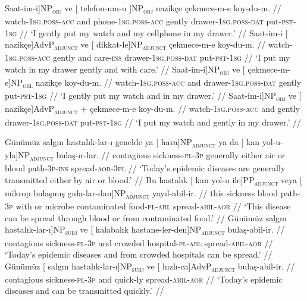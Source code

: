 \pex[exno=TS8, glspace=!1em,everygla={},everyglb={},aboveglbskip=-.15ex, interpartskip=15pt]
\label{TS8}
\a
\begingl
\gla {[} {Saat-im-i}]NP\textsubscript{\textsc{obj}} ve {[} { telefon-um-u }]NP\textsubscript{\textsc{obj}} nazikçe çekmece-m-e koy-du-m. //
\glb {}watch-\textsc{1sg.poss}-\textsc{acc}{} and {phone}-\textsc{1sg.poss}-\textsc{acc}{} gently drawer-\textsc{1sg.poss}-\textsc{dat} put-\textsc{pst}-\textsc{1sg} //
\glft `I gently put my watch and my cellphone in my drawer.' //
\endgl
\a
\begingl\gla Saat-im-i {[} nazikçe{]}AdvP\textsubscript{\textsc{adjunct}} ve {[} dikkat-le{]}NP\textsubscript{\textsc{adjunct}}  çekmece-m-e koy-du-m. //
\glb watch-\textsc{1sg.poss}-\textsc{acc} gently and care-\textsc{ins} drawer-\textsc{1sg.poss}-\textsc{dat} put-\textsc{pst}-\textsc{1sg} //
\glft `I put my watch in my drawer gently and with care.' //
\endgl
\a
\begingl
\gla {[} Saat-im-i{]}NP\textsubscript{\textsc{obj}} ve {[} çekmece-m-e{]}NP\textsubscript{\textsc{obl}} nazikçe koy-du-m. //
\glb {}watch-\textsc{1sg.poss}-\textsc{acc}{} and {}drawer-\textsc{1sg.poss}-\textsc{dat}{} gently put-\textsc{pst}-\textsc{1sg} //
\glft `I gently put my watch and in my drawer.' //
\endgl
\a
\begingl
\gla {[} Saat-im-i{]}NP\textsubscript{\textsc{obj}} ve {[} nazikçe{]}AdvP\textsubscript{\textsc{adjunct}} + çekmece-m-e koy-du-m. //
\glb {}watch-\textsc{1sg.poss}-\textsc{acc}{} and {}gently{} drawer-\textsc{1sg.poss}-\textsc{dat}  put-\textsc{pst}-\textsc{1sg} //
\glft `I put my watch and gently in my drawer.' //
\endgl
\xe

\pex[exno=TS9, glspace=!1em,everygla={},everyglb={},aboveglbskip=-.15ex, interpartskip=15pt]
\label{TS9}
\a
\begingl
\gla Günümüz salgın hastalık-lar-ı genelde ya {[} {hava]}NP\textsubscript{\textsc{adjunct}} {ya da} {[} kan {yol-u-yla]}NP\textsubscript{\textsc{adjunct}} bulaş-ır-lar. //
 contagious sickness-\textsc{pl}-\textsc{3p} generally either air or blood path-\textsc{3p}-\textsc{ins} spread-\textsc{aor}-\textsc{3pl} //
\glft `Today's epidemic diseases are generally transmitted either by air or blood.' //
\endgl
\a
\begingl
\gla Bu hastalık {[} kan yol-u {ile]}PP\textsubscript{\textsc{adjunct}} veya {[} mikrop bulaşmış {gıda-lar-dan]}NP\textsubscript{\textsc{adjunct}} yayıl-abil-ir. //
\glb this sickness blood path-\textsc{3p} with or microbe contaminated food-\textsc{pl}-\textsc{abl} spread-\textsc{abil}-\textsc{aor} //
\glft `This disease can be spread through blood or from contaminated food.' //
\endgl
\a
\begingl
\gla {[} Günümüz salgın {hastalık-lar-ı]}NP\textsubscript{\textsc{subj}} ve {[} kalabalık {hastane-ler-den]}NP\textsubscript{\textsc{adjunct}} bulaş-abil-ir. //
 contagious sickness-\textsc{pl}-\textsc{3p} and crowded hospital-\textsc{pl}-\textsc{abl} spread-\textsc{abil}-\textsc{aor}  //
\glft `Today's epidemic diseases and from crowded hospitals can be spread.' //
\endgl
\a
\begingl
\gla Günümüz {[} salgın {hastalık-lar-ı]}NP\textsubscript{\textsc{subj}} ve {[} {hızlı-ca]}AdvP\textsubscript{\textsc{adjunct}} bulaş-abil-ir. //
 contagious sickness-\textsc{pl}-\textsc{3p} and quick-ly spread-\textsc{abil}-\textsc{aor} //
\glft `Today's epidemic diseases and can be transmitted quickly.' //
\endgl
\xe

